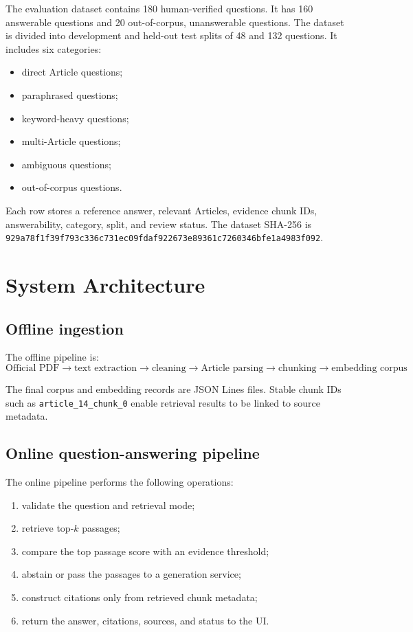 \documentclass[11pt]{article}
\begin{document}
The evaluation dataset contains 180 human-verified questions. It has 160 answerable questions and 20 out-of-corpus, unanswerable questions. The dataset is divided into development and held-out test splits of 48 and 132 questions. It includes six categories:
\begin{itemize}[nosep]
  \item direct Article questions;
  \item paraphrased questions;
  \item keyword-heavy questions;
  \item multi-Article questions;
  \item ambiguous questions;
  \item out-of-corpus questions.
\end{itemize}

Each row stores a reference answer, relevant Articles, evidence chunk IDs, answerability, category, split, and review status. The dataset SHA-256 is
\texttt{929a78f1f39f793c336c731ec09fdaf922673e89361c7260346bfe1a4983f092}.

\section{System Architecture}

\subsection{Offline ingestion}

The offline pipeline is:
\[
\text{Official PDF}
\rightarrow \text{text extraction}
\rightarrow \text{cleaning}
\rightarrow \text{Article parsing}
\rightarrow \text{chunking}
\rightarrow \text{embedding corpus}
\]

The final corpus and embedding records are JSON Lines files. Stable chunk IDs such as \texttt{article\_14\_chunk\_0} enable retrieval results to be linked to source metadata.

\subsection{Online question-answering pipeline}

The online pipeline performs the following operations:
\begin{enumerate}[nosep]
  \item validate the question and retrieval mode;
  \item retrieve top-$k$ passages;
  \item compare the top passage score with an evidence threshold;
  \item abstain or pass the passages to a generation service;
  \item construct citations only from retrieved chunk metadata;
  \item return the answer, citations, sources, and status to the UI.
\end{enumerate}
\end{document}
